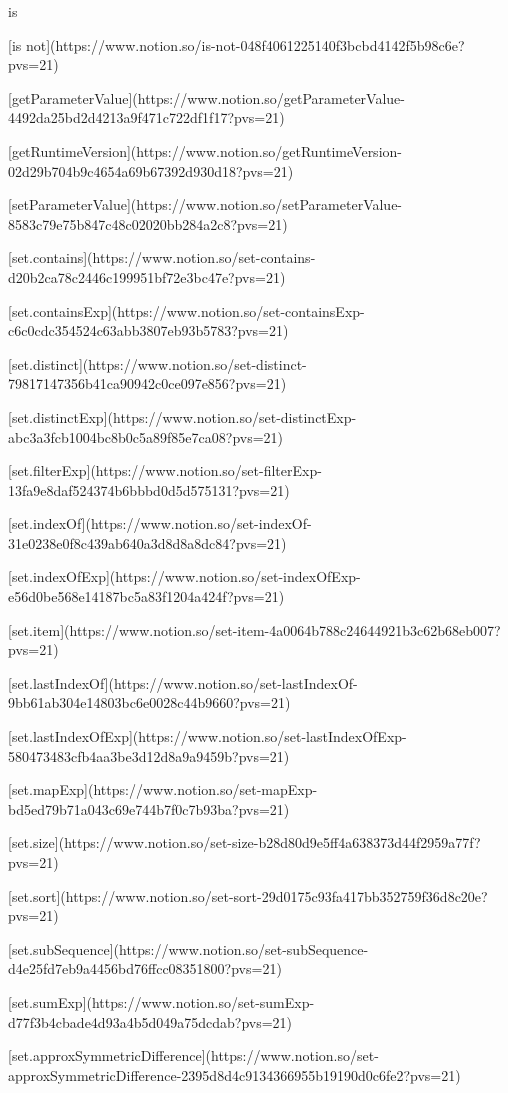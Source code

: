  is

[is not](https://www.notion.so/is-not-048f4061225140f3bcbd4142f5b98c6e?pvs=21)

[getParameterValue](https://www.notion.so/getParameterValue-4492da25bd2d4213a9f471c722df1f17?pvs=21)

[getRuntimeVersion](https://www.notion.so/getRuntimeVersion-02d29b704b9c4654a69b67392d930d18?pvs=21)

[setParameterValue](https://www.notion.so/setParameterValue-8583c79e75b847c48c02020bb284a2c8?pvs=21)

[set.contains](https://www.notion.so/set-contains-d20b2ca78c2446c199951bf72e3bc47e?pvs=21)

[set.containsExp](https://www.notion.so/set-containsExp-c6c0cdc354524c63abb3807eb93b5783?pvs=21)

[set.distinct](https://www.notion.so/set-distinct-79817147356b41ca90942c0ce097e856?pvs=21)

[set.distinctExp](https://www.notion.so/set-distinctExp-abc3a3fcb1004bc8b0c5a89f85e7ca08?pvs=21)

[set.filterExp](https://www.notion.so/set-filterExp-13fa9e8daf524374b6bbbd0d5d575131?pvs=21)

[set.indexOf](https://www.notion.so/set-indexOf-31e0238e0f8c439ab640a3d8d8a8dc84?pvs=21)

[set.indexOfExp](https://www.notion.so/set-indexOfExp-e56d0be568e14187bc5a83f1204a424f?pvs=21)

[set.item](https://www.notion.so/set-item-4a0064b788c24644921b3c62b68eb007?pvs=21)

[set.lastIndexOf](https://www.notion.so/set-lastIndexOf-9bb61ab304e14803bc6e0028c44b9660?pvs=21)

[set.lastIndexOfExp](https://www.notion.so/set-lastIndexOfExp-580473483cfb4aa3be3d12d8a9a9459b?pvs=21)

[set.mapExp](https://www.notion.so/set-mapExp-bd5ed79b71a043c69e744b7f0c7b93ba?pvs=21)

[set.size](https://www.notion.so/set-size-b28d80d9e5ff4a638373d44f2959a77f?pvs=21)

[set.sort](https://www.notion.so/set-sort-29d0175c93fa417bb352759f36d8c20e?pvs=21)

[set.subSequence](https://www.notion.so/set-subSequence-d4e25fd7eb9a4456bd76ffcc08351800?pvs=21)

[set.sumExp](https://www.notion.so/set-sumExp-d77f3b4cbade4d93a4b5d049a75dcdab?pvs=21)

[set.approxSymmetricDifference](https://www.notion.so/set-approxSymmetricDifference-2395d8d4c9134366955b19190d0c6fe2?pvs=21)

